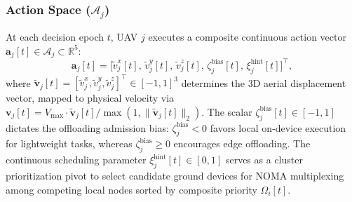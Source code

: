 \documentclass[journal]{IEEEtran}
\begin{document}
\subsubsection{Action Space (\texorpdfstring{$\mathcal{A}_j$}{A\_j})}
At each decision epoch $t$, UAV $j$ executes a composite continuous action vector $\mathbf{a}_j[t] \in \mathcal{A}_j \subset \mathbb{R}^5$:
\begin{equation}
    \mathbf{a}_j[t] = \bigl[ \tilde{v}_j^x[t], \, \tilde{v}_j^y[t], \, \tilde{v}_j^z[t], \, \zeta_j^{\mathrm{bias}}[t], \, \xi_j^{\mathrm{hint}}[t] \bigr]^\top,
\end{equation}
where $\tilde{\mathbf{v}}_j[t] = [\tilde{v}_j^x, \tilde{v}_j^y, \tilde{v}_j^z]^\top \in [-1, 1]^3$ determines the 3D aerial displacement vector, mapped to physical velocity via $\mathbf{v}_j[t] = V_{\max} \cdot \tilde{\mathbf{v}}_j[t] / \max(1, \|\tilde{\mathbf{v}}_j[t]\|_2)$. The scalar $\zeta_j^{\mathrm{bias}}[t] \in [-1, 1]$ dictates the offloading admission bias: $\zeta_j^{\mathrm{bias}} < 0$ favors local on-device execution for lightweight tasks, whereas $\zeta_j^{\mathrm{bias}} \ge 0$ encourages edge offloading. The continuous scheduling parameter $\xi_j^{\mathrm{hint}}[t] \in [0, 1]$ serves as a cluster prioritization pivot to select candidate ground devices for NOMA multiplexing among competing local nodes sorted by composite priority $\Omega_i[t]$.
\end{document}
